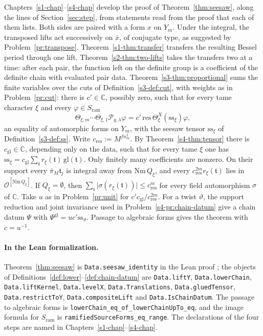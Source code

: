 \documentclass[reqno]{amsart}
\newcounter{chap}
\theoremstyle{definition}
\theoremstyle{plain}
\newcommand{\C}{\mathbb{C}}
\newcommand{\Oc}{\mathcal{O}}
\newcommand{\Pc}{\mathcal{P}}
\newcommand{\ram}{\mathrm{ram}}
\newcommand{\tl}[1]{\texttt{#1}}
\begin{document}
Chapters~\ref{s1-chap}--\ref{s4-chap} develop the proof of Theorem~\ref{thm:seesaw}, along the lines of Section~\ref{sec:step}, from statements read from the proof that each of them lists.  Both sides are paired with a form \(x\) on \(Y_m\).  Under the integral, the transposed lifts act successively on \(\bar x\), of conjugate type, as suggested by Problem~\ref{pr:transpose}.  Theorem~\ref{s1-thm:transfer} transfers the resulting Bessel period through one lift.  Theorem~\ref{s2-thm:two-lifts} takes the transfers two at a time: after each pair, the function left on the definite group is a coefficient of the definite chain with evaluated pair data.  Theorem~\ref{s3-thm:proportional} sums the finite variables over the cuts of Definition~\ref{s3-def:cut}, with weights as in Problem~\ref{pr:cut}: there is \(c' \in \C\), possibly zero, such that for every tame character \(\xi\) and every \(\varphi \in S_{\ram}\)
\[
  \Theta_{\xi,m}\cdots\Theta_{\xi,1}\Pc_{g,\lambda}\varphi = c'\,\mathrm{res}\,\Theta^X_\xi(\mathrm{ss}_\xi)\varphi ,
\]
an equality of automorphic forms on \(Y_m\), with the seesaw tensor \(\mathrm{ss}_\xi\) of Definition~\ref{s3-def:ss}.  Write \(c_{\mathrm{res}} := M^{fn_m^2}\).  By Theorem~\ref{s4-thm:tensor} there is \(c_{\mathrm{gl}} \in \C\), depending only on the data, such that for every tame \(\xi\) one has \(\mathrm{ss}_\xi = c_{\mathrm{gl}}\sum_{\mathfrak t} r_\xi(\mathfrak t)\,\mathrm{gl}(\mathfrak t)\).  Only finitely many coefficients are nonzero.  On their support every \(\bar\pi_M\mathfrak t_j\) is integral away from \(\mathrm{Nm}\,Q_\xi\), and every \(c_{\mathrm{res}}^{2m} r_\xi(\mathfrak t)\) lies in \(\Oc^{[\mathrm{Nm}\,Q_\xi]}\).  If \(Q_\xi = \emptyset\), then \(\sum_{\mathfrak t} \lvert\sigma(r_\xi(\mathfrak t))\rvert \le c_{\mathrm{res}}^m\) for every field automorphism \(\sigma\) of \(\C\).  Take \(u\) as in Problem~\ref{pr:unit} for \(c'c_{\mathrm{gl}}/c_{\mathrm{res}}^{2m}\).  For a twist \(\vartheta\), the support reduction and joint invariance used in Problem~\ref{s4-pr:chain-datum} give a chain datum \(\Psi\) with \(\Psi^{\mathrm{gl}} = u c'\mathrm{ss}_\vartheta\).  Passage to algebraic forms gives the theorem with \(c = u^{-1}\).

\paragraph{In the Lean formalization.}
{\raggedright Theorem~\ref{thm:seesaw} is \tl{Data.seesaw\_identity} in the Lean proof \cite{GL}; the objects of Definitions~\ref{def:lower}--\ref{def:chain-datum} are \tl{Data.liftY}, \tl{Data.lowerChain}, \tl{Data.liftKernel}, \tl{Data.levelX}, \tl{Data.Translations}, \tl{Data.gluedTensor}, \tl{Data.restrictToY}, \tl{Data.compositeLift} and \tl{Data.IsChainDatum}.  The passage to algebraic forms is \tl{lowerChain\_eq\_of\_lowerChainUpTo\_eq}, and the image formula for \(S_{\ram}\) is \tl{ramifiedSourceForms\_eq\_range}.  The declarations of the four steps are named in Chapters~\ref{s1-chap}--\ref{s4-chap}.\par}
\end{document}
